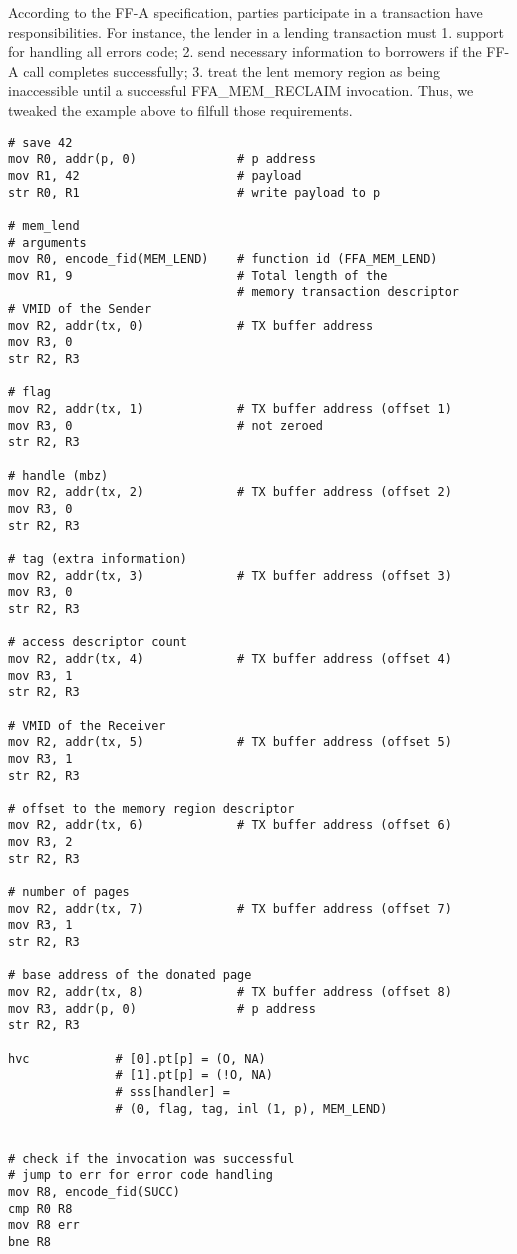\documentclass{article}
\begin{document}
\clearpage
According to the FF-A specification, parties participate in a transaction have responsibilities. For instance, the lender in a lending transaction must 1. support for handling all errors code; 2. send necessary information to borrowers if the FF-A call completes successfully; 3. treat the lent memory region as being inaccessible until a successful FFA\_MEM\_RECLAIM invocation. Thus, we tweaked the example above to filfull those requirements.
\begin{lstlisting}[caption={VM 0}]
# save 42
mov R0, addr(p, 0)              # p address
mov R1, 42                      # payload
str R0, R1                      # write payload to p

# mem_lend
# arguments
mov R0, encode_fid(MEM_LEND)    # function id (FFA_MEM_LEND)
mov R1, 9                       # Total length of the
                                # memory transaction descriptor
# VMID of the Sender
mov R2, addr(tx, 0)             # TX buffer address
mov R3, 0
str R2, R3

# flag
mov R2, addr(tx, 1)             # TX buffer address (offset 1)
mov R3, 0                       # not zeroed
str R2, R3

# handle (mbz)
mov R2, addr(tx, 2)             # TX buffer address (offset 2)
mov R3, 0
str R2, R3

# tag (extra information)
mov R2, addr(tx, 3)             # TX buffer address (offset 3)
mov R3, 0
str R2, R3

# access descriptor count
mov R2, addr(tx, 4)             # TX buffer address (offset 4)
mov R3, 1
str R2, R3

# VMID of the Receiver
mov R2, addr(tx, 5)             # TX buffer address (offset 5)
mov R3, 1
str R2, R3

# offset to the memory region descriptor
mov R2, addr(tx, 6)             # TX buffer address (offset 6)
mov R3, 2
str R2, R3

# number of pages
mov R2, addr(tx, 7)             # TX buffer address (offset 7)
mov R3, 1
str R2, R3

# base address of the donated page
mov R2, addr(tx, 8)             # TX buffer address (offset 8)
mov R3, addr(p, 0)              # p address
str R2, R3

hvc            # [0].pt[p] = (O, NA)
               # [1].pt[p] = (!O, NA)
               # sss[handler] =
               # (0, flag, tag, inl (1, p), MEM_LEND)


# check if the invocation was successful
# jump to err for error code handling
mov R8, encode_fid(SUCC)
cmp R0 R8
mov R8 err
bne R8


\end{lstlisting}
\end{document}
